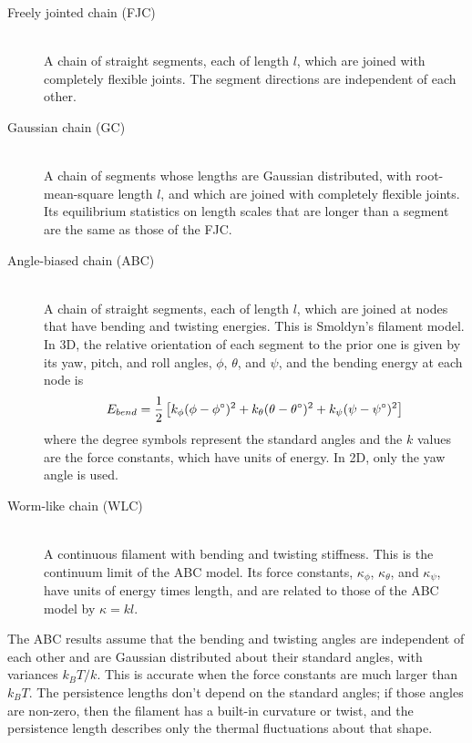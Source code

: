 \documentclass[11pt]{article}
\begin{document}
\begin{description}

\item[Freely jointed chain (FJC)]
\hfill \\
A chain of straight segments, each of length $l$, which are joined with completely flexible joints. The segment directions are independent of each other.

\item[Gaussian chain (GC)]
\hfill \\
A chain of segments whose lengths are Gaussian distributed, with root-mean-square length $l$, and which are joined with completely flexible joints. Its equilibrium statistics on length scales that are longer than a segment are the same as those of the FJC.

\item[Angle-biased chain (ABC)]
\hfill \\
A chain of straight segments, each of length $l$, which are joined at nodes that have bending and twisting energies. This is Smoldyn's filament model. In 3D, the relative orientation of each segment to the prior one is given by its yaw, pitch, and roll angles, $\phi$, $\theta$, and $\psi$, and the bending energy at each node is
\begin{equation}
E_{bend} = \frac{1}{2} \left[k_\phi (\phi-\phi\degree)^2 + k_\theta (\theta-\theta\degree)^2 + k_\psi (\psi-\psi\degree)^2 \right]
\end{equation}
where the degree symbols represent the standard angles and the $k$ values are the force constants, which have units of energy. In 2D, only the yaw angle is used.

\item[Worm-like chain (WLC)]
\hfill \\
A continuous filament with bending and twisting stiffness. This is the continuum limit of the ABC model. Its force constants, $\kappa_\phi$, $\kappa_\theta$, and $\kappa_\psi$, have units of energy times length, and are related to those of the ABC model by $\kappa=k l$.

\end{description}

The ABC results assume that the bending and twisting angles are independent of each other and are Gaussian distributed about their standard angles, with variances $k_BT/k$. This is accurate when the force constants are much larger than $k_BT$. The persistence lengths don't depend on the standard angles; if those angles are non-zero, then the filament has a built-in curvature or twist, and the persistence length describes only the thermal fluctuations about that shape.
\end{document}
